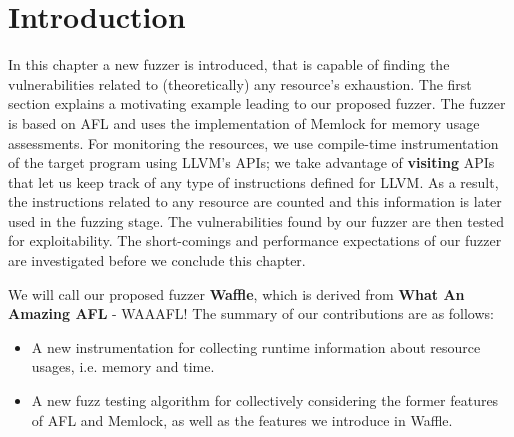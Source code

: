 \section{Introduction}
In this chapter a new fuzzer is introduced, that is capable of finding the vulnerabilities related to (theoretically) any resource's exhaustion. The first section explains a motivating example leading to our proposed fuzzer. The fuzzer is based on AFL and uses the implementation of Memlock for memory usage assessments. For monitoring the resources, we use compile-time instrumentation of the target program using LLVM's APIs; we take advantage of \textbf{visiting} APIs that let us keep track of any type of instructions defined for LLVM. As a result, the instructions related to any resource are counted and this information is later used in the fuzzing stage. The vulnerabilities found by our fuzzer are then tested for exploitability. The short-comings and performance expectations of our fuzzer are investigated before we conclude this chapter.

We will call our proposed fuzzer \textbf{Waffle}, which is derived from \textbf{What An Amazing AFL} - WAAAFL! The summary of our contributions are as follows:

\begin{itemize}
    \item A new instrumentation for collecting runtime information about resource usages, i.e. memory and time.
    \item A new fuzz testing algorithm for collectively considering the former features of AFL and Memlock, as well as the features we introduce in Waffle.
\end{itemize}

